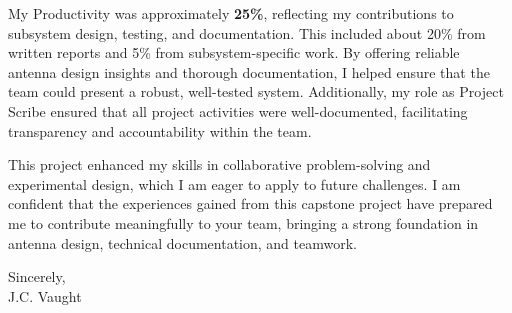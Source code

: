 \documentclass[11pt]{article}
\begin{document}
\begin{flushleft}
My Productivity was approximately \textbf{25\%}, reflecting my contributions to subsystem design, testing, and documentation. This included about 20\% from written reports and 5\% from subsystem-specific work. By offering reliable antenna design insights and thorough documentation, I helped ensure that the team could present a robust, well-tested system. Additionally, my role as Project Scribe ensured that all project activities were well-documented, facilitating transparency and accountability within the team.

This project enhanced my skills in collaborative problem-solving and experimental design, which I am eager to apply to future challenges. I am confident that the experiences gained from this capstone project have prepared me to contribute meaningfully to your team, bringing a strong foundation in antenna design, technical documentation, and teamwork.

\vspace{12pt}

Sincerely, \\
J.C. Vaught

\end{flushleft}
\end{document}
